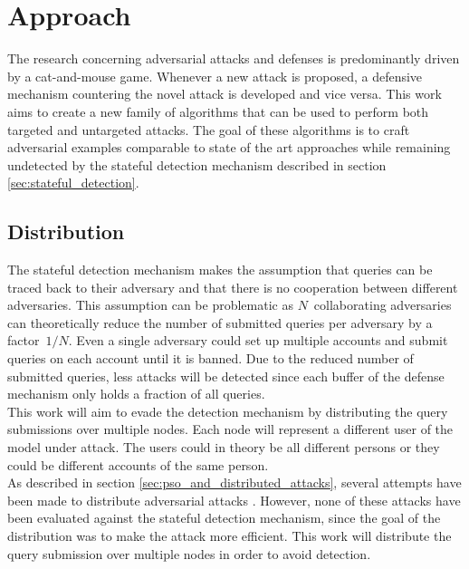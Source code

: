 \chapter{Approach}
The research concerning adversarial attacks and defenses is predominantly driven by a cat-and-mouse game. Whenever a new attack is proposed, a defensive mechanism countering the novel attack is developed and vice versa. This work aims to create a new family of algorithms that can be used to perform both targeted and untargeted attacks. The goal of these algorithms is to craft adversarial examples comparable to state of the art approaches while remaining undetected by the stateful detection mechanism \cite{chen_stateful_2019} described in section \ref{sec:stateful_detection}.\\

\section{Distribution}
The stateful detection mechanism \cite{chen_stateful_2019} makes the assumption that queries can be traced back to their adversary and that there is no cooperation between different adversaries. This assumption can be problematic as $N$~collaborating adversaries can theoretically reduce the number of submitted queries per adversary by a factor~$1/N$. Even a single adversary could set up multiple accounts and submit queries on each account until it is banned. Due to the reduced number of submitted queries, less attacks will be detected since each buffer of the defense mechanism only holds a fraction of all queries.\\

This work will aim to evade the detection mechanism by distributing the query submissions over multiple nodes. Each node will represent a different user of the model under attack. The users could in theory be all different persons or they could be different accounts of the same person.\\

As described in section \ref{sec:pso_and_distributed_attacks}, several attempts have been made to distribute adversarial attacks \cite{distributed_pso_attack, suryanto2020}. However, none of these attacks have been evaluated against the stateful detection mechanism, since the goal of the distribution was to make the attack more efficient. This work will distribute the query submission over multiple nodes in order to avoid detection.\\


